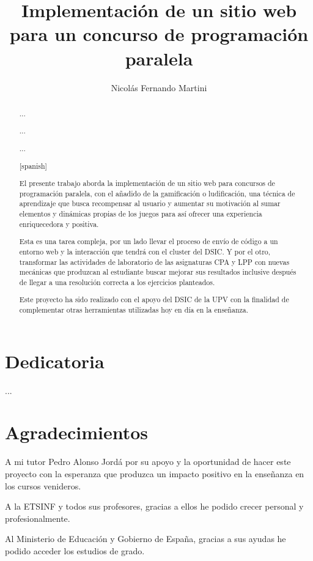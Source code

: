 \documentclass[11pt,spanish,listoffigures,listoftables]{tfgetsinf}
\title{Implementación de un sitio web para un concurso de programación paralela}
\author{Nicolás Fernando Martini}
\newenvironment{dedication}
{%
	\thispagestyle{empty}%
	\itshape             %
}
{\par %
	\vspace{\stretch{3}} %
	\clearpage           %
}
\begin{document}
	

\begin{dedication}	
	
	\chapter*{Dedicatoria}
	
	...

	\chapter*{Agradecimientos}
		A mi tutor Pedro Alonso Jordá por su apoyo y la oportunidad de hacer este proyecto con la esperanza que produzca un impacto positivo en la enseñanza en los cursos venideros. \par
		A la ETSINF y todos sus profesores, gracias a ellos he podido crecer personal y profesionalmente. \par
		Al Ministerio de Educación y Gobierno de España, gracias a sus ayudas he podido acceder los estudios de grado.
		
\end{dedication}

\begin{abstract}

... \par

... \par

... \par

\end{abstract}

\begin{abstract}[spanish]
	
El presente trabajo aborda la implementación de un sitio web para concursos de programación paralela, con el añadido de la gamificación o ludificación, una técnica de aprendizaje que busca recompensar al usuario y aumentar su motivación al sumar elementos y dinámicas propias de los juegos para así ofrecer una experiencia enriquecedora y positiva. \par 

Esta es una tarea compleja, por un lado llevar el proceso de envío de código a un entorno web y la interacción que tendrá con el cluster \kahan del DSIC. Y por el otro, transformar las actividades de laboratorio de las asignaturas CPA y LPP con nuevas mecánicas que produzcan al estudiante buscar mejorar sus resultados inclusive después de llegar a una resolución correcta a los ejercicios planteados. \par

Este proyecto ha sido realizado con el apoyo del DSIC de la UPV con la finalidad de complementar otras herramientas utilizadas hoy en día en la enseñanza. \par


\end{abstract}
\end{document}
